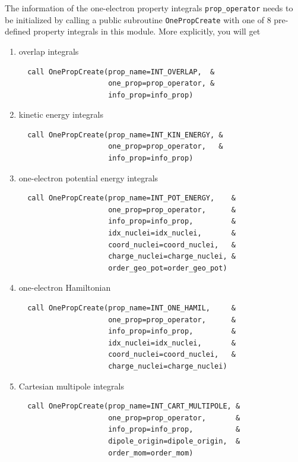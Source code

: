 \documentclass[a4paper,11pt,twoside,openright]{book}
\begin{document}
The information of the one-electron property integrals \verb|prop_operator| needs to be initialized by
calling a public subroutine \verb|OnePropCreate| with one of 8 pre-defined property integrals in this
module. More explicitly, you will get
\begin{enumerate}
  \item overlap integrals
\begin{verbatim}
  call OnePropCreate(prop_name=INT_OVERLAP,  &
                     one_prop=prop_operator, &
                     info_prop=info_prop)
\end{verbatim}
  \item kinetic energy integrals
\begin{verbatim}
  call OnePropCreate(prop_name=INT_KIN_ENERGY, &
                     one_prop=prop_operator,   &
                     info_prop=info_prop)
\end{verbatim}
  \item one-electron potential energy integrals
\begin{verbatim}
  call OnePropCreate(prop_name=INT_POT_ENERGY,    &
                     one_prop=prop_operator,      &
                     info_prop=info_prop,         &
                     idx_nuclei=idx_nuclei,       &
                     coord_nuclei=coord_nuclei,   &
                     charge_nuclei=charge_nuclei, &
                     order_geo_pot=order_geo_pot)
\end{verbatim}
  \item one-electron Hamiltonian
\begin{verbatim}
  call OnePropCreate(prop_name=INT_ONE_HAMIL,     &
                     one_prop=prop_operator,      &
                     info_prop=info_prop,         &
                     idx_nuclei=idx_nuclei,       &
                     coord_nuclei=coord_nuclei,   &
                     charge_nuclei=charge_nuclei)
\end{verbatim}
  \item Cartesian multipole integrals
\begin{verbatim}
  call OnePropCreate(prop_name=INT_CART_MULTIPOLE, &
                     one_prop=prop_operator,       &
                     info_prop=info_prop,          &
                     dipole_origin=dipole_origin,  &
                     order_mom=order_mom)

\end{verbatim}
\end{enumerate}
\end{document}
